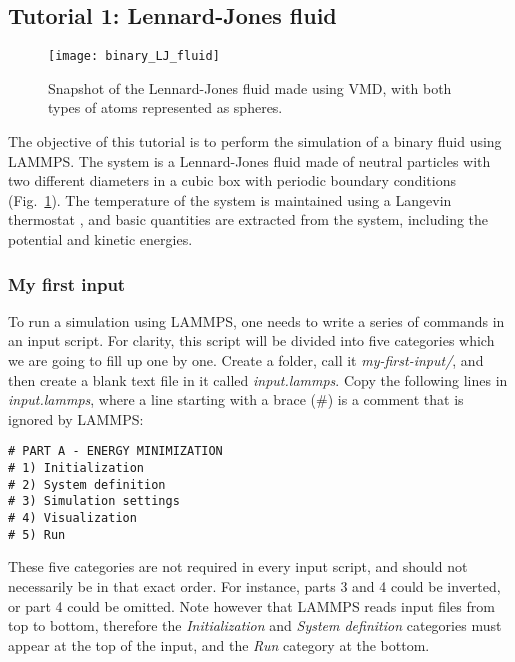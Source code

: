 \subsection{Tutorial 1: Lennard-Jones fluid}
\label{lennard-jones-label}

\begin{figure}
{\centering
\texttt{[image: binary\_LJ\_fluid]}
\caption{Snapshot of the Lennard-Jones fluid made using VMD, with both types of atoms represented as spheres.}}
\label{fig:binary_LJ_fluid}
\end{figure}

\noindent The objective of this tutorial is to perform the simulation of a binary fluid using LAMMPS. The system is a Lennard-Jones fluid made of neutral particles with two different diameters in a cubic box with periodic boundary conditions (Fig.~\ref{fig:binary_LJ_fluid}). The temperature of the system is maintained using a Langevin thermostat \cite{schneider1978molecular}, and basic quantities are extracted from the system, including the potential and kinetic energies. 

\subsubsection{My first input}

\noindent To run a simulation using LAMMPS, one needs to write a series of commands in an input script. For clarity, this script will be divided into five categories which we are going to fill up one by one. Create a folder, call it \textit{my-first-input/}, and then create a blank text file in it called \textit{input.lammps}. Copy the following lines in \textit{input.lammps}, where a line starting with a brace ($\#$) is a comment that is ignored by LAMMPS:
{\small  \begin{verbatim}
# PART A - ENERGY MINIMIZATION
# 1) Initialization
# 2) System definition
# 3) Simulation settings
# 4) Visualization
# 5) Run
\end{verbatim} }
\noindent These five categories are not required in every input script, and should not necessarily be in that exact order. For instance, parts 3 and 4 could be inverted, or part 4 could be omitted. Note however that LAMMPS reads input files from top to bottom, therefore the \textit{Initialization} and \textit{System definition} categories must appear at the top of the input, and the \textit{Run} category at the bottom.

